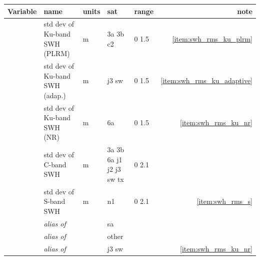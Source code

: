 \documentclass[a4paper,11pt,openany,natbib,nomargin]{thesis}
\newcommand\alias[1]{\emph{alias of} \var{#1}}
\newenvironment{vartable}{
\begin{table}[ht]
\small
\begin{tabular}{lllllr}
\hline\hline
Variable & name & units & sat & range & note \\
\hline\hline
}{
\hline
\end{tabular}
\end{table}
}
\begin{document}
\begin{vartable}
\var{swh_rms_ku_plrm} & std dev of Ku-band SWH (PLRM) & m & 3a 3b c2 & 0 1.5 & \ref{item:swh_rms_ku_plrm} \\
\var{swh_rms_ku_adaptive} & std dev of Ku-band SWH (adap.) & m & j3 sw & 0 1.5 & \ref{item:swh_rms_ku_adaptive} \\
\var{swh_rms_ku_nr} & std dev of Ku-band SWH (NR) & m & 6a & 0 1.5 & \ref{item:swh_rms_ku_nr} \\
\var{swh_rms_c} & std dev of C-band SWH & m & 3a 3b 6a j1 j2 j3 sw tx & 0 2.1 & \\
\var{swh_rms_s} & std dev of S-band SWH & m & n1 & 0 2.1 & \ref{item:swh_rms_s}\\
\hline
\var{swh_rms} & \alias{swh_rms_ka} && sa && \\
\var{swh_rms} & \alias{swh_rms_ku} && other && \\
\var{swh_rms_ku_nr} & \alias{swh_rms_ku_adaptive} & & j3 sw & & \ref{item:swh_rms_ku_nr} \\
\end{vartable}
\end{document}
